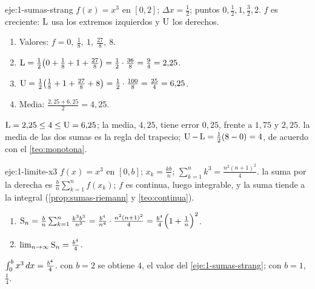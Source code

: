 \begin{solucion}{eje:1-sumas-strang}
\datos $f(x)=x^{3}$ en $[0,2]$; $\Delta x=\frac12$; puntos $0,\frac12,1,\frac32,2$.
\planteamiento $f$ es creciente: $\operatorname{L}$ usa los extremos izquierdos y $\operatorname{U}$ los derechos.
\pasos
\begin{enumerate}[label=\arabic*.]
  \item Valores: $f=0,\ \frac18,\ 1,\ \frac{27}{8},\ 8$.
  \item $\operatorname{L}=\frac12\bigl(0+\frac18+1+\frac{27}{8}\bigr)=\frac12\cdot\frac{36}{8}=\frac94=2{,}25$.
  \item $\operatorname{U}=\frac12\bigl(\frac18+1+\frac{27}{8}+8\bigr)=\frac12\cdot\frac{100}{8}=\frac{25}{4}=6{,}25$.
  \item Media: $\frac{2{,}25+6{,}25}{2}=4{,}25$.
\end{enumerate}
\resultado $\operatorname{L}=2{,}25\le4\le\operatorname{U}=6{,}25$; la media, $4{,}25$, tiene error $0{,}25$, frente a $1{,}75$ y $2{,}25$.
\comprobacion la media de las dos sumas es la regla del trapecio; $\operatorname{U}-\operatorname{L}=\frac12(8-0)=4$, de acuerdo con el \cref{teo:monotona}.
\end{solucion}

\begin{solucion}{eje:1-limite-x3}
\datos $f(x)=x^{3}$ en $[0,b]$; $x_k=\frac{kb}{n}$; $\sum_{k=1}^{n}k^{3}=\frac{n^{2}(n+1)^{2}}{4}$.
\planteamiento la suma por la derecha es $\frac bn\sum_{k=1}^{n}f(x_k)$; $f$ es continua, luego integrable, y la suma tiende a la integral (\cref{prop:sumas-riemann} y \cref{teo:continua}).
\pasos
\begin{enumerate}[label=\arabic*.]
  \item $\operatorname{S}_n=\frac bn\sum_{k=1}^{n}\frac{k^{3}b^{3}}{n^{3}}=\frac{b^{4}}{n^{4}}\cdot\frac{n^{2}(n+1)^{2}}{4}=\frac{b^{4}}{4}\Bigl(1+\frac1n\Bigr)^{2}$.
  \item $\lim_{n\to\infty}\operatorname{S}_n=\frac{b^{4}}{4}$.
\end{enumerate}
\resultado $\int_0^bx^{3}\mathop{}\!d x=\frac{b^{4}}{4}$.
\comprobacion con $b=2$ se obtiene $4$, el valor del \cref{eje:1-sumas-strang}; con $b=1$, $\frac14$.
\end{solucion}

